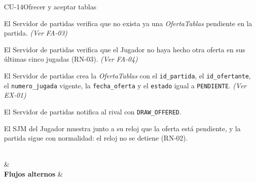 \begin{fichacu}{CU-14}{Ofrecer y aceptar tablas}
{\begin{cuenum}[start=1]
      \item El Servidor de partidas verifica que no exista ya una \textit{OfertaTablas} pendiente en la partida. \textit{(Ver \mbox{FA-03})}
      \item El Servidor de partidas verifica que el Jugador no haya hecho otra oferta en sus últimas cinco jugadas (\mbox{RN-03}). \textit{(Ver \mbox{FA-04})}
      \item El Servidor de partidas crea la \textit{OfertaTablas} con el \texttt{id\_\allowbreak{}partida}, el \texttt{id\_\allowbreak{}ofertante}, el \texttt{numero\_\allowbreak{}jugada} vigente, la \texttt{fecha\_\allowbreak{}oferta} y el \texttt{estado} igual a \texttt{PENDIENTE}. \textit{(Ver \mbox{EX-01})}
      \item El Servidor de partidas notifica al rival con \texttt{DRAW\_\allowbreak{}OFFERED}.
      \item El SJM del Jugador muestra junto a su reloj que la oferta está pendiente, y la partida sigue con normalidad: el reloj no se detiene (\mbox{RN-02}).
    \end{cuenum}} \\
   &  \\ \hline
  \textbf{Flujos alternos} & 
\end{fichacu}
